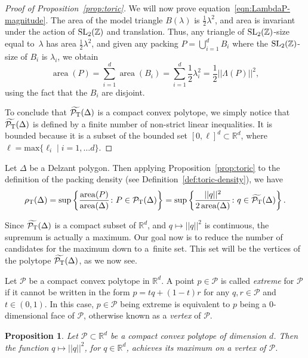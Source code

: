 \documentclass[pdftex]{sigma}
\numberwithin{equation}{section}
\newtheorem{Proposition}[Theorem]{Proposition}
\def\R{{\mathbb R}}
\def\Z{{\mathbb Z}}
\newcommand{\De}{\Delta}
\newcommand{\area}{\operatorname{area}}
\newcommand{\PT}{\mathcal{P}_{\rm T}}
\newcommand{\PTtilde}{\widetilde{\PT}}
\newcommand{\SL}{{\rm SL}_2(\Z)}
\begin{document}
\begin{proof}[Proof of Proposition~\ref{prop:toric}]
We will now prove equation~\eqref{eqn:LambdaP-magnitude}.
The area of the model triangle $B(\lambda)$ is $\frac{1}{2}\lambda^2$, and area is invariant under the action of $\SL$ and translation.
Thus, any triangle of $\SL$-size equal to~$\lambda$ has area $\frac{1}{2}\lambda^2$,
and given any packing $P = \bigcup_{i=1}^d B_i$ where the $\SL$-size of $B_i$ is $\lambda_i$, we obtain
\[
 \area(P) = \sum_{i=1}^d \area(B_i) = \sum_{i=1}^d \frac{1}{2} \lambda_i^2 = \frac{1}{2} || \Lambda(P) ||^2,
\]
using the fact that the $B_i$ are disjoint.


To conclude that $\PTtilde(\De)$ is a compact convex polytope, we simply notice that $\PTtilde(\De)$ is defined by a finite number of non-strict linear inequalities. It is bounded because it is a subset of the bounded set $[0,\ell]^d\subset \R^d$, where $\ell = \mathrm{max}\{ \ell_i \mid i = 1,\ldots d\}$.
\end{proof}

Let $\De$ be a Delzant polygon. Then applying Proposition~\ref{prop:toric} to the definition of the packing density (see Definition~\ref{def:toric-density}), we have
\[
 \rho_{{\rm T}}(\De) = \sup \left\{ \frac{\area(P)}{\area(\De)}\colon  P \in \PT(\De) \right\} = \sup \left\{ \frac{||q||^2}{2 \area(\De)}\colon  q \in \PTtilde(\De) \right\}.
\]

Since $\PTtilde(\De)$ is a compact subset of $\R^d$, and $q\mapsto ||q||^2$ is continuous, the supremum is actually a maximum. Our goal now is to reduce the number of candidates for the maximum down to a~finite set. This set will be the vertices of the polytope $\PTtilde(\De)$, as we now see.

Let $\mathcal{P}$ be a compact convex polytope in $\R^d$. A point $p\in\mathcal{P}$ is called \emph{extreme} for $\mathcal{P}$ if it cannot be written in the form $ p = t q + (1- t) r$ for any $q,r \in \mathcal{P}$ and $t \in (0,1)$. In this case, $p\in\mathcal{P}$ being extreme is equivalent to $p$ being a $0$-dimensional face of $\mathcal{P}$, otherwise known as a \emph{vertex} of $\mathcal{P}$.

\begin{Proposition}
\label{prop:vert}
 Let $\mathcal{P}\subset \R^d$ be a compact convex polytope of dimension $d$. Then the function $q\mapsto ||q||^2$, for $q\in\R^d$, achieves its maximum on a vertex of $\mathcal{P}$.
\end{Proposition}
\end{document}
